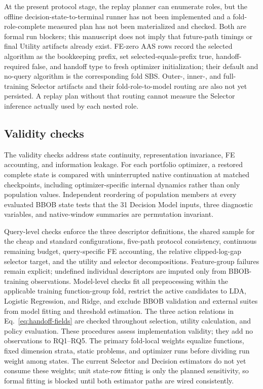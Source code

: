 At the present protocol stage, the replay planner can enumerate roles, but the
offline decision-state-to-terminal runner has not been implemented and a
fold-role-complete measured plan has not been materialized and checked.  Both
are formal run blockers; this manuscript does not imply that future-path
timings or final Utility artifacts already exist.  FE-zero AAS rows record the
selected algorithm as the bookkeeping prefix, set selected-equals-prefix true,
handoff-required false, and handoff type to fresh optimizer initialization;
their default and no-query algorithm is the corresponding fold SBS.
Outer-, inner-, and full-training Selector artifacts and their fold-role-to-model
routing are also not yet persisted.  A replay plan without that routing cannot
measure the Selector inference actually used by each nested role.

\subsection{Validity checks}

The validity checks address state continuity, representation invariance, FE
accounting, and information leakage.  For each portfolio optimizer, a restored
complete state is compared with uninterrupted native continuation at matched
checkpoints, including optimizer-specific internal dynamics rather than only
population values.  Independent reordering of population members at every
evaluated BBOB state tests that the 31 Decision Model inputs, three diagnostic
variables, and native-window summaries are permutation invariant.

Query-level checks enforce the three descriptor definitions, the shared sample
for the cheap and standard configurations, five-path protocol consistency,
continuous remaining budget, query-specific FE accounting, the relative
clipped-log-gap selector target, and the utility and selector decompositions.
Feature-group failures remain explicit; undefined individual descriptors are
imputed only from BBOB-training observations.  Model-level checks fit all
preprocessing within the applicable training function-group fold, restrict the active
candidates to LDA, Logistic Regression, and Ridge, and exclude BBOB validation
and external suites from model fitting and threshold estimation.  The three
action relations in Eq.~\eqref{eq:handoff-fields} are checked throughout
selection, utility calculation, and policy evaluation.  These procedures assess
implementation validity; they add no observations to RQ1--RQ5.
The primary fold-local weights equalize functions, fixed dimension strata,
static problems, and optimizer runs before dividing run weight among states.
The current Selector and Decision estimators do not yet consume these weights;
unit state-row fitting is only the planned sensitivity, so formal fitting is
blocked until both estimator paths are wired consistently.

